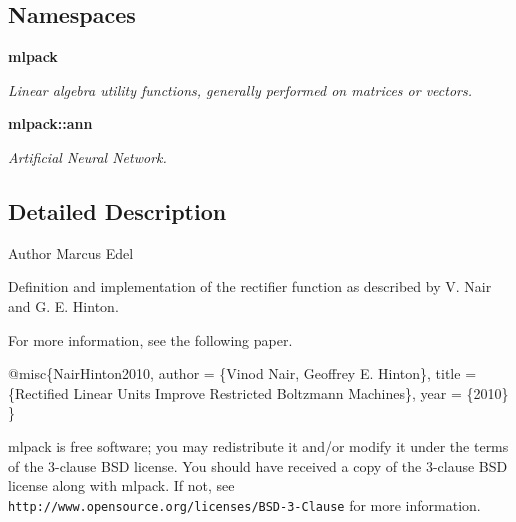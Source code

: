 \subsection*{Namespaces}
\begin{DoxyCompactItemize}
\item 
 {\bf mlpack}
\begin{DoxyCompactList}\small\item\em Linear algebra utility functions, generally performed on matrices or vectors. \end{DoxyCompactList}\item 
 {\bf mlpack\+::ann}
\begin{DoxyCompactList}\small\item\em Artificial Neural Network. \end{DoxyCompactList}\end{DoxyCompactItemize}


\subsection{Detailed Description}
\begin{DoxyAuthor}{Author}
Marcus Edel
\end{DoxyAuthor}
Definition and implementation of the rectifier function as described by V. Nair and G. E. Hinton.

For more information, see the following paper.


\begin{DoxyCode}
@misc\{NairHinton2010,
  author = \{Vinod Nair, Geoffrey E. Hinton\},
  title = \{Rectified Linear Units Improve Restricted Boltzmann Machines\},
  year = \{2010\}
\}
\end{DoxyCode}


mlpack is free software; you may redistribute it and/or modify it under the terms of the 3-\/clause B\+SD license. You should have received a copy of the 3-\/clause B\+SD license along with mlpack. If not, see {\tt http\+://www.\+opensource.\+org/licenses/\+B\+S\+D-\/3-\/\+Clause} for more information. 